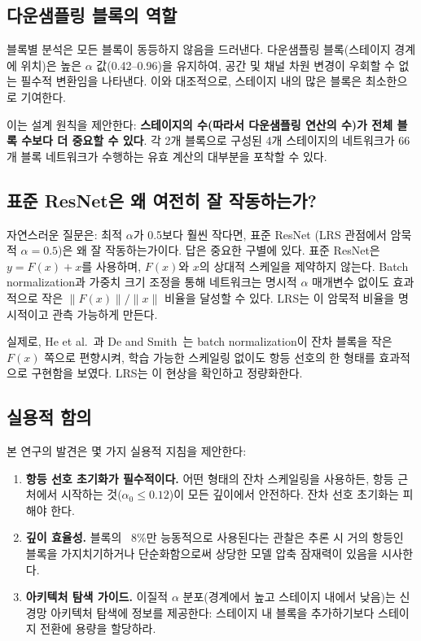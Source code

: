 \documentclass[preprint,12pt]{elsarticle}
\begin{document}
\subsection{다운샘플링 블록의 역할}

블록별 분석은 모든 블록이 동등하지 않음을 드러낸다. 다운샘플링 블록(스테이지 경계에 위치)은 높은 $\alpha$ 값(0.42--0.96)을 유지하여, 공간 및 채널 차원 변경이 우회할 수 없는 필수적 변환임을 나타낸다. 이와 대조적으로, 스테이지 내의 많은 블록은 최소한으로 기여한다.

이는 설계 원칙을 제안한다: \textbf{스테이지의 수(따라서 다운샘플링 연산의 수)가 전체 블록 수보다 더 중요할 수 있다}. 각 2개 블록으로 구성된 4개 스테이지의 네트워크가 66개 블록 네트워크가 수행하는 유효 계산의 대부분을 포착할 수 있다.

\subsection{표준 ResNet은 왜 여전히 잘 작동하는가?}

자연스러운 질문은: 최적 $\alpha$가 0.5보다 훨씬 작다면, 표준 ResNet (LRS 관점에서 암묵적 $\alpha = 0.5$)은 왜 잘 작동하는가이다. 답은 중요한 구별에 있다. 표준 ResNet은 $y = F(x) + x$를 사용하며, $F(x)$와 $x$의 상대적 스케일을 제약하지 않는다. Batch normalization과 가중치 크기 조정을 통해 네트워크는 명시적 $\alpha$ 매개변수 없이도 효과적으로 작은 $\|F(x)\|/\|x\|$ 비율을 달성할 수 있다. LRS는 이 암묵적 비율을 명시적이고 관측 가능하게 만든다.

실제로, He et al.~\cite{he2016identity}과 De and Smith~\cite{de2020batch}는 batch normalization이 잔차 블록을 작은 $F(x)$ 쪽으로 편향시켜, 학습 가능한 스케일링 없이도 항등 선호의 한 형태를 효과적으로 구현함을 보였다. LRS는 이 현상을 확인하고 정량화한다.

\subsection{실용적 함의}

본 연구의 발견은 몇 가지 실용적 지침을 제안한다:

\begin{enumerate}
    \item \textbf{항등 선호 초기화가 필수적이다.} 어떤 형태의 잔차 스케일링을 사용하든, 항등 근처에서 시작하는 것($\alpha_0 \leq 0.12$)이 모든 깊이에서 안전하다. 잔차 선호 초기화는 피해야 한다.
    \item \textbf{깊이 효율성.} 블록의 ~8\%만 능동적으로 사용된다는 관찰은 추론 시 거의 항등인 블록을 가지치기하거나 단순화함으로써 상당한 모델 압축 잠재력이 있음을 시사한다.
    \item \textbf{아키텍처 탐색 가이드.} 이질적 $\alpha$ 분포(경계에서 높고 스테이지 내에서 낮음)는 신경망 아키텍처 탐색에 정보를 제공한다: 스테이지 내 블록을 추가하기보다 스테이지 전환에 용량을 할당하라.
\end{enumerate}
\end{document}

